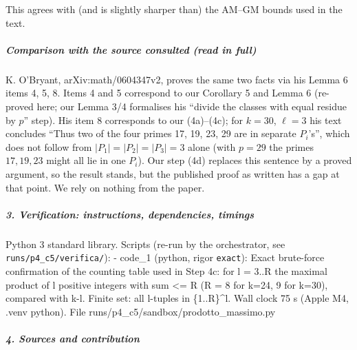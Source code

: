 \documentclass[11pt,a4paper]{article}
\begin{document}
This agrees with (and is slightly sharper than) the AM--GM bounds used
in the text.

\subparagraph{Comparison with the source consulted (read in
full)}\label{comparison-with-the-source-consulted-read-in-full}

K. O'Bryant, arXiv:math/0604347v2, proves the same two facts via his
Lemma 6 items 4, 5, 8. Items 4 and 5 correspond to our Corollary 5 and
Lemma 6 (re-proved here; our Lemma 3/4 formalises his ``divide the
classes with equal residue by \(p\)'' step). His item 8 corresponds to
our (4a)--(4c); for \(k=30\), \(\ell=3\) his text concludes ``Thus two
of the four primes 17, 19, 23, 29 are in separate \(P_i\)'s'', which
does not follow from \(|P_1|=|P_2|=|P_3|=3\) alone (with \(p=29\) the
primes \(17,19,23\) might all lie in one \(P_i\)). Our step (4d)
replaces this sentence by a proved argument, so the result stands, but
the published proof as written has a gap at that point. We rely on
nothing from the paper.

\subparagraph{3. Verification: instructions, dependencies,
timings}\label{verification-instructions-dependencies-timings}

Python 3 standard library. Scripts (re-run by the orchestrator, see
\texttt{runs/p4\_c5/verifica/}): - code\_1 (python, rigor
\texttt{exact}): Exact brute-force confirmation of the counting table
used in Step 4c: for l = 3..\textbar R\textbar{} the maximal product of
l positive integers with sum \textless= \textbar R\textbar{}
(\textbar R\textbar{} = 8 for k=24, 9 for k=30), compared with k-l.
Finite set: all l-tuples in \{1..\textbar R\textbar\}\^{}l. Wall clock
75 s (Apple M4, .venv python). File
runs/p4\_c5/sandbox/prodotto\_massimo.py

\subparagraph{4. Sources and
contribution}\label{sources-and-contribution}
\end{document}
